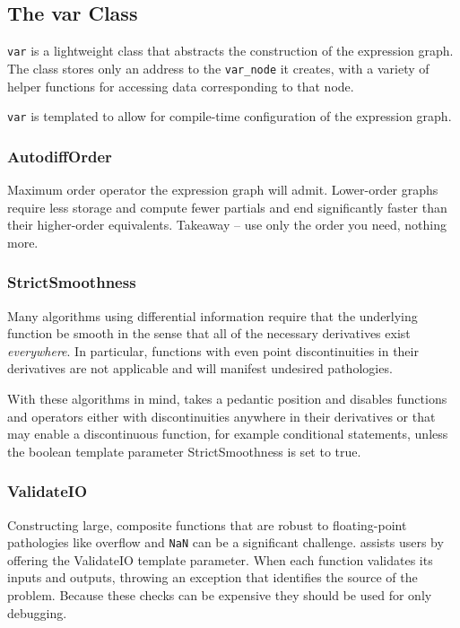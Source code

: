 \subsection{The var Class}

\verb|var| is a lightweight class that abstracts the construction of the 
expression graph.  The class stores only an address to the \verb|var_node|
it creates, with a variety of helper functions for accessing data corresponding
to that node.

\verb|var| is templated to allow for compile-time configuration of the
expression graph.

\subsubsection{AutodiffOrder}

Maximum order operator the expression graph will admit.  Lower-order
graphs require less storage and compute fewer partials and end
significantly faster than their higher-order equivalents.  Takeaway --
use only the order you need, nothing more.

\subsubsection{StrictSmoothness}

Many algorithms using differential information require that the underlying
function be smooth in the sense that all of the necessary derivatives
exist \textit{everywhere}.  In particular, functions with even point
discontinuities in their derivatives are not applicable and will manifest
undesired pathologies.

With these algorithms in mind, \nomad takes a pedantic position and
disables functions and operators either with discontinuities anywhere 
in their derivatives or that may enable a discontinuous function, for
example conditional statements, unless the boolean template parameter
StrictSmoothness is set to true.

\subsubsection{ValidateIO}

Constructing large, composite functions that are robust to floating-point
pathologies like overflow and \verb|NaN| can be a significant challenge.
\nomad assists users by offering the ValidateIO template parameter.
When each function validates its inputs and outputs, throwing an
exception that identifies the source of the problem.  Because these
checks can be expensive they should be used for only debugging.

